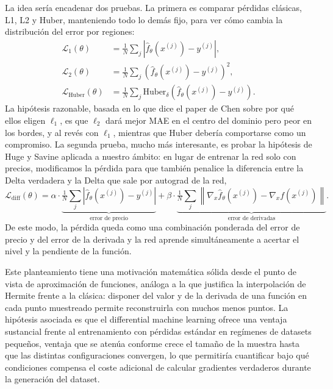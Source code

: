\documentclass[11pt,a4paper]{article}
\begin{document}
La idea sería encadenar dos pruebas. La primera es comparar pérdidas clásicas, L1, L2 y Huber, manteniendo todo lo demás fijo, para ver cómo cambia la distribución del error por regiones:
\begin{align}
\mathcal{L}_{1}(\theta) &= \tfrac{1}{N} \textstyle\sum_j |\hat{f}_\theta(x^{(j)}) - y^{(j)}|, \\
\mathcal{L}_{2}(\theta) &= \tfrac{1}{N} \textstyle\sum_j (\hat{f}_\theta(x^{(j)}) - y^{(j)})^2, \\
\mathcal{L}_{\mathrm{Huber}}(\theta) &= \tfrac{1}{N} \textstyle\sum_j \mathrm{Huber}_\delta\!\left(\hat{f}_\theta(x^{(j)}) - y^{(j)}\right).
\end{align}
La hipótesis razonable, basada en lo que dice el paper de Chen sobre por qué ellos eligen $\ell_1$, es que $\ell_2$ dará mejor MAE en el centro del dominio pero peor en los bordes, y al revés con $\ell_1$, mientras que Huber debería comportarse como un compromiso. La segunda prueba, mucho más interesante, es probar la hipótesis de Huge y Savine aplicada a nuestro ámbito: en lugar de entrenar la red solo con precios, modificamos la pérdida para que también penalice la diferencia entre la Delta verdadera y la Delta que sale por autograd de la red,
\begin{equation}
\mathcal{L}_{\mathrm{diff}}(\theta) = \alpha \cdot \underbrace{\tfrac{1}{N} \textstyle\sum_j \left| \hat{f}_\theta(x^{(j)}) - y^{(j)} \right|}_{\text{error de precio}} + \beta \cdot \underbrace{\tfrac{1}{N} \textstyle\sum_j \left\| \nabla_x \hat{f}_\theta(x^{(j)}) - \nabla_x f(x^{(j)}) \right\|}_{\text{error de derivadas}}.
\end{equation}
De este modo, la pérdida queda como una combinación ponderada del error de precio y del error de la derivada y la red aprende simultáneamente a acertar el nivel y la pendiente de la función.

Este planteamiento tiene una motivación matemática sólida desde el punto de vista de aproximación de funciones, análoga a la que justifica la interpolación de Hermite frente a la clásica: disponer del valor y de la derivada de una función en cada punto muestreado permite reconstruirla con muchos menos puntos. La hipótesis asociada es que el differential machine learning ofrece una ventaja sustancial frente al entrenamiento con pérdidas estándar en regímenes de datasets pequeños, ventaja que se atenúa conforme crece el tamaño de la muestra hasta que las distintas configuraciones convergen, lo que permitiría cuantificar bajo qué condiciones compensa el coste adicional de calcular gradientes verdaderos durante la generación del dataset.
\end{document}
